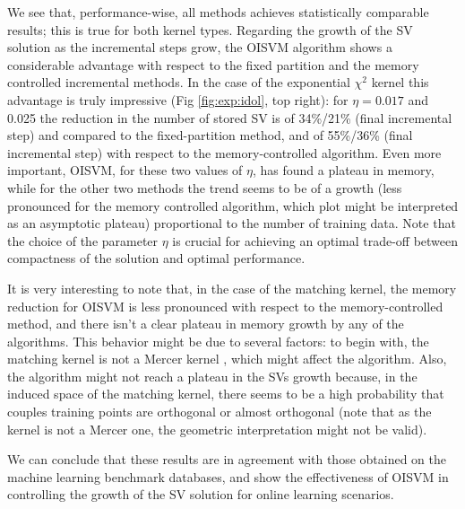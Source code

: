 We see that, performance-wise, all methods achieves statistically comparable results; this
is true for both kernel types. Regarding the growth of the SV solution as the incremental
steps grow, the OISVM algorithm shows a considerable advantage with respect to the fixed partition
and the memory controlled incremental methods. In the case of the exponential $\chi^{2}$
kernel this advantage is truly impressive (Fig \ref{fig:exp:idol}, top right): for $\eta=0.017$ 
and 0.025 the reduction in the number of stored SV is of 34\%/21\% (final incremental step) 
and compared to the fixed-partition method, and of 55\%/36\% (final incremental step) with
respect to the memory-controlled algorithm. Even more important, OISVM, for these two 
values of $\eta$, has found a plateau in memory, while for the other two methods
the trend seems to be of a growth (less pronounced for the memory controlled algorithm,
which plot might be interpreted as an asymptotic plateau) proportional to 
the number of training data. Note that the choice of the parameter $\eta$ is crucial for
achieving an optimal trade-off between compactness of the solution and optimal performance.  

It is very interesting to note that, in the case of the matching kernel, the memory reduction
for OISVM is less pronounced with respect to the memory-controlled method, and there isn't a clear 
plateau in memory growth by any of the algorithms. 
This behavior might be due to several factors: to begin with,
the matching kernel is not a Mercer kernel \cite{fleuret:bmvc04}, 
which might affect the algorithm. Also,
the algorithm might not 
reach a plateau in the SVs growth because, in the induced space of
the matching kernel,  there seems to be a high probability that couples
training points are orthogonal or almost orthogonal (note that as the kernel
is not a Mercer one, the geometric interpretation might not be valid).

We can conclude that these results are in agreement with those obtained on the
machine learning benchmark databases, and show the effectiveness of OISVM in
controlling the growth of the SV solution for online learning scenarios.



